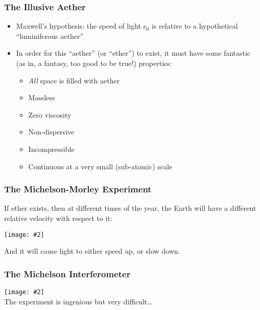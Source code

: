 \documentclass[12pt,compress,aspectratio=169]{beamer}
\newcommand{\pic}[2]{\texttt{[image: \#2]}}
\begin{document}
\begin{frame}
  \frametitle{The Illusive Aether}
  \begin{itemize}
  \item Maxwell's hypothesis: the speed of light $c_0$ is relative to a
    hypothetical ``luminiferous aether''
  \item In order for this ``aether'' (or ``ether'') to exist, it must have some
    fantastic (as in, a fantasy, too good to be true!) properties:
    \begin{itemize}
    \item \emph{All} space is filled with aether
    \item Massless
    \item Zero viscosity
    \item Non-dispersive
    \item Incompressible
    \item Continuous at a very small (sub-atomic) scale
    \end{itemize}
  \end{itemize}
\end{frame}



\begin{frame}
  \frametitle{The Michelson-Morley Experiment}
  If ether exists, then at different times of the year, the Earth will have a
  different relative velocity with respect to it:
  \begin{center}
    \pic{.45}{graphics/2000px-AetherWind.png}
  \end{center}
  And it will cause light to either speed up, or slow down.
\end{frame}



\begin{frame}
  \frametitle{The Michelson Interferometer}
  \pic{1}{graphics/michelsonmorley.jpg}\\
  The experiment is ingenious but very difficult\ldots
\end{frame}
\end{document}
